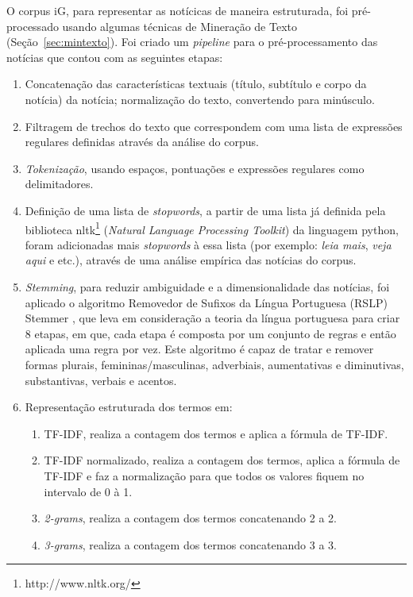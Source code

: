 \documentclass[normaltoc, espacoumemeio, pnumromarab,ruledheader]{abnt}
\begin{document}
O corpus iG, para representar as notícicas de maneira estruturada, foi pré-processado usando algumas técnicas de Mineração de Texto (Seção~\ref{sec:mintexto}).
Foi criado um \textit{pipeline} para o pré-processamento das notícias que contou com as seguintes etapas:
\begin{enumerate}[label*=\arabic*.]
  \item Concatenação das características textuais (título, subtítulo e corpo da notícia) da notícia; normalização do texto, convertendo para minúsculo.
  \item Filtragem de trechos do texto que correspondem com uma lista de expressões regulares definidas através da análise do corpus.
  \item \textit{Tokenização}, usando espaços, pontuações e expressões regulares como delimitadores.
  \item Definição de uma lista de \textit{stopwords}, a partir de uma lista já definida pela biblioteca nltk\footnote{http://www.nltk.org/} (\textit{Natural Language Processing Toolkit}) da linguagem python, foram adicionadas mais \textit{stopwords} à essa lista (por exemplo: \textit{leia mais}, \textit{veja aqui} e etc.), através de uma análise empírica das notícias do corpus.
  \item \textit{Stemming}, para reduzir ambiguidade e a dimensionalidade das notícias, foi aplicado o algoritmo Removedor de Sufixos da Língua Portuguesa (RSLP) Stemmer \cite{Alvares2005}, que leva em consideração a teoria da língua portuguesa para criar 8 etapas, em que, cada etapa é composta por um conjunto de regras e então aplicada uma regra por vez. Este algoritmo é capaz de tratar e remover formas plurais, femininas/masculinas, adverbiais, aumentativas e diminutivas, substantivas, verbais e acentos.
  \item Representação estruturada dos termos em:
  \begin{enumerate}[label*=\arabic*.]
    \item TF-IDF, realiza a contagem dos termos e aplica a fórmula de TF-IDF.
    \item TF-IDF normalizado, realiza a contagem dos termos, aplica a fórmula de TF-IDF e faz a normalização para que todos os valores fiquem no intervalo de 0 à 1.
    \item \textit{2-grams}, realiza a contagem dos termos concatenando 2 a 2.
    \item \textit{3-grams}, realiza a contagem dos termos concatenando 3 a 3.
  \end{enumerate}
\end{enumerate}
\end{document}
